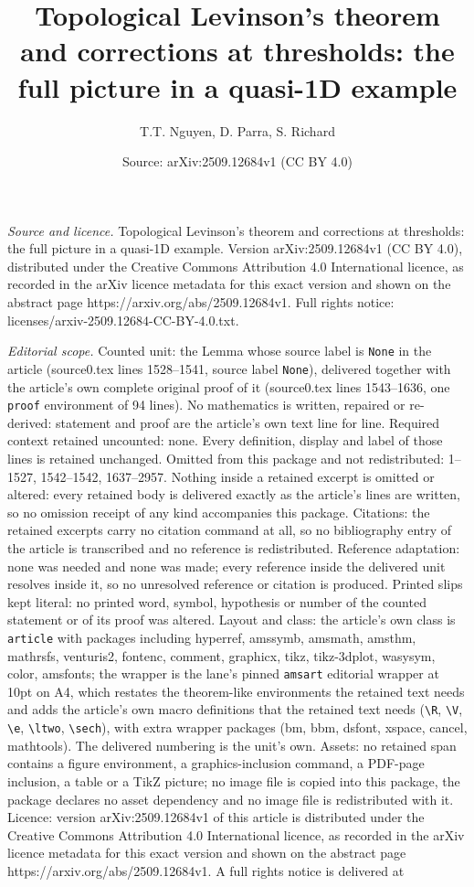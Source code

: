 \documentclass[10pt,a4paper]{amsart}
\title[Topological Levinson's theorem and corrections at thresholds]{Topological Levinson's theorem and corrections at thresholds: the full picture in a quasi-1D example}
\author{T.T. Nguyen, D. Parra, S. Richard}
\date{Source: arXiv:2509.12684v1 (CC BY 4.0)}
\begin{document}
\maketitle

\noindent\emph{Source and licence.} Topological Levinson's theorem and corrections at thresholds: the full picture in a quasi-1D example. Version arXiv:2509.12684v1 (CC BY 4.0), distributed under the Creative Commons Attribution 4.0 International licence, as recorded in the arXiv licence metadata for this exact version and shown on the abstract page https://arxiv.org/abs/2509.12684v1. Full rights notice: licenses/arxiv-2509.12684-CC-BY-4.0.txt.\par\smallskip

\noindent\textit{Editorial scope.} Counted unit: the Lemma whose source label is \texttt{None} in the article (source0.tex lines 1528--1541, source label \texttt{None}), delivered together with the article's own complete original proof of it (source0.tex lines 1543--1636, one \texttt{proof} environment of 94 lines). No mathematics is written, repaired or re-derived: statement and proof are the article's own text line for line. Required context retained uncounted: none. Every definition, display and label of those lines is retained unchanged. Omitted from this package and not redistributed: 1--1527, 1542--1542, 1637--2957. Nothing inside a retained excerpt is omitted or altered: every retained body is delivered exactly as the article's lines are written, so no omission receipt of any kind accompanies this package. Citations: the retained excerpts carry no citation command at all, so no bibliography entry of the article is transcribed and no reference is redistributed. Reference adaptation: none was needed and none was made; every reference inside the delivered unit resolves inside it, so no unresolved reference or citation is produced. Printed slips kept literal: no printed word, symbol, hypothesis or number of the counted statement or of its proof was altered. Layout and class: the article's own class is \texttt{article} with packages including hyperref, amssymb, amsmath, amsthm, mathrsfs, venturis2, fontenc, comment, graphicx, tikz, tikz-3dplot, wasysym, color, amsfonts; the wrapper is the lane's pinned \texttt{amsart} editorial wrapper at 10pt on A4, which restates the theorem-like environments the retained text needs and adds the article's own macro definitions that the retained text needs (\texttt{\textbackslash R}, \texttt{\textbackslash V}, \texttt{\textbackslash e}, \texttt{\textbackslash ltwo}, \texttt{\textbackslash sech}), with extra wrapper packages (bm, bbm, dsfont, xspace, cancel, mathtools). The delivered numbering is the unit's own. Assets: no retained span contains a figure environment, a graphics-inclusion command, a PDF-page inclusion, a table or a TikZ picture; no image file is copied into this package, the package declares no asset dependency and no image file is redistributed with it. Licence: version arXiv:2509.12684v1 of this article is distributed under the Creative Commons Attribution 4.0 International licence, as recorded in the arXiv licence metadata for this exact version and shown on the abstract page https://arxiv.org/abs/2509.12684v1. A full rights notice is delivered at 
\end{document}

